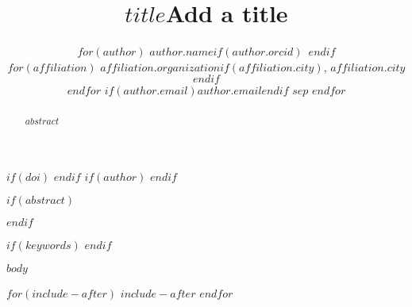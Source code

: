 \documentclass[
  $if(papersize)$
  $papersize$paper,
  $endif$]{article}
\title{$title$}
\title{Add a title}
\date{\formatteddate}
\date{}
\author{
$for(author)$
  $author.name$$if(author.orcid)$~\orcidlink{$author.orcid$}$endif$\\
  $for(affiliation)$
    $affiliation.organization$$if(affiliation.city)$, $affiliation.city$$endif$\\
  $endfor$
  $if(author.email)$\texttt{$author.email$}$endif$
  $sep$\And
$endfor$
}
\begin{document}
$if(doi)$
\renewcommand{\arxivdoi}{\href{https://doi.org/$doi$}{$doi$}}
$endif$
$if(author)$
\renewcommand{\arxivauthor}{$for(author)$$author.name$$sep$, $endfor$}
$endif$

\maketitle

\setcounter{section}{0}

\setcounter{secnumdepth}{5}
\renewcommand{\thesection}{\arabic{section}}
\renewcommand{\thesubsection}{\thesection.\arabic{subsection}}
\renewcommand{\thesubsubsection}{\thesubsection.\arabic{subsubsection}}
\renewcommand{\theparagraph}{\thesubsubsection.\arabic{paragraph}}
\renewcommand{\thesubparagraph}{\theparagraph.\arabic{subparagraph}}

$if(abstract)$
    \begin{abstract}
        $abstract$
    \end{abstract}
$endif$


$if(keywords)$
$endif$

$body$

$for(include-after)$
$include-after$
$endfor$
\end{document}
